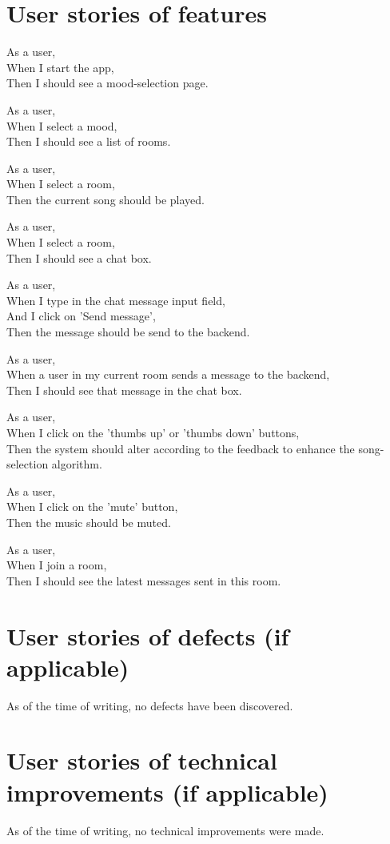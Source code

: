 \section{User stories of features}
As a user,\\
When I start the app,\\
Then I should see a mood-selection page.

As a user,\\
When I select a mood,\\
Then I should see a list of rooms.

As a user,\\
When I select a room,\\
Then the current song should be played.

As a user,\\
When I select a room,\\
Then I should see a chat box.

As a user,\\
When I type in the chat message input field,\\
And I click on 'Send message',\\
Then the message should be send to the backend.

As a user,\\
When a user in my current room sends a message to the backend,\\
Then I should see that message in the chat box.

As a user,\\
When I click on the 'thumbs up' or 'thumbs down' buttons,\\
Then the system should alter according to the feedback to enhance the song-selection algorithm.

As a user,\\
When I click on the 'mute' button,\\
Then the music should be muted.

As a user,\\
When I join a room,\\
Then I should see the latest messages sent in this room.

\section{User stories of defects (if applicable)}
As of the time of writing, no defects have been discovered.

\section{User stories of technical improvements (if applicable)}
As of the time of writing, no technical improvements were made.

